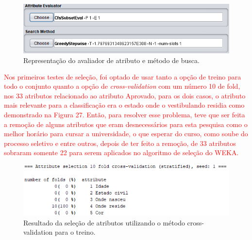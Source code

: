 \par
\begin{figure}[!htp]
	\begin{center}
    \caption{\label{fig:waveform_fig} Representação do avaliador de atributo e método de busca.}
	\includegraphics[scale=0.90]{Figuras/Avaliador_de_atributo.png}
	\end{center}
\end{figure}

\par
\textcolor{red}{Nos primeiros testes de seleção, foi optado de usar tanto a opção de treino para todo o conjunto quanto a opção de \textit{cross-validation} com um número 10 de fold, nos 33 atributos relacionado ao atributo Aprovado, para os dois casos, o atributo mais relevante para a classificação era o estado onde o vestibulando residia como demonstrado na Figura 27. Então, para resolver esse problema, teve que ser feita a remoção de alguns atributos que eram desnecessários para esta pesquisa como o melhor horário para cursar a universidade, o que esperar do curso, como soube do processo seletivo e entre outros, depois de ter feito a remoção, de 33 atributos sobraram somente 22 para serem aplicados no algoritmo de seleção do WEKA.}

\par
\begin{figure}[!htp]
	\begin{center}
    \caption{\label{fig:waveform_fig} Resultado da seleção de atributos utilizando o método cross-validation para o treino.}
	\includegraphics[scale=0.99]{Figuras/33_atributos.png}
	\end{center}
\end{figure}

\par
\textcolor{red}{}

